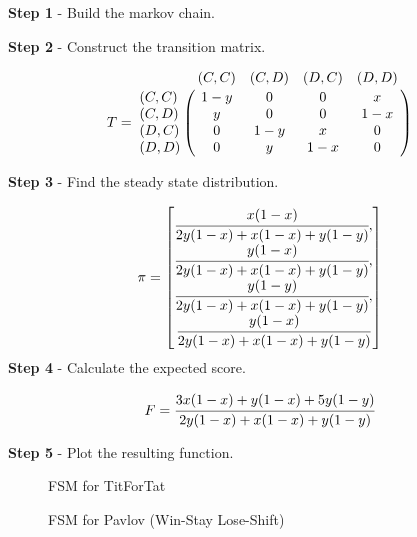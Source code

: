 \textbf{Step 1} - Build the markov chain.

\textbf{Step 2} - Construct the transition matrix.

\begin{equation}\label{eq:transition_matrix}
%
T = \bordermatrix{~      & (C, C) & (C, D) & (D, C) & (D, D) \cr
                  (C, C) & 1 - y  & 0      & 0      & x      \cr
                  (C, D) & y      & 0      & 0      & 1 - x  \cr
                  (D, C) & 0      & 1 - y  & x      & 0      \cr
                  (D, D) & 0      & y      & 1 - x  & 0}
%
\end{equation}

\textbf{Step 3} - Find the steady state distribution.

\begin{equation}\label{eq:steady_state}
%
\pi =
\begin{bmatrix}
\cfrac{x (1 - x)}{2y(1-x) + x(1-x) + y(1-y)}, \\
\cfrac{y (1 - x)}{2y(1-x) + x(1-x) + y(1-y)}, \\
\cfrac{y (1 - y)}{2y(1-x) + x(1-x) + y(1-y)}, \\
\cfrac{y (1 - x)}{2y(1-x) + x(1-x) + y(1-y)}
\end{bmatrix}
\end{equation}
\textbf{Step 4} - Calculate the expected score.

\begin{equation}
F = \cfrac{3x(1-x) + y(1-x) + 5y(1-y)}{2y(1-x) + x(1-x) + y(1-y)}
\end{equation}

\textbf{Step 5} - Plot the resulting function.


\begin{figure}[!hbtp]
    \begin{center}
        
        \caption{FSM for TitForTat}\label{fig:Tit4TatFSM}
        
        \caption{FSM for Pavlov (Win-Stay Lose-Shift)}\label{fig:PavlovFSM}
    \end{center}
\end{figure}



